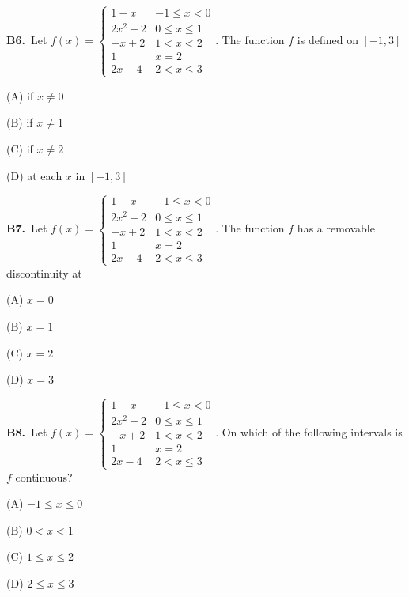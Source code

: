 \documentclass[11pt]{article}
\begin{document}
\bigskip\noindent\textbf{B6.}\ Let $f(x)=\begin{cases}1-x&-1\le x<0\\2x^2-2&0\le x\le1\\-x+2&1<x<2\\1&x=2\\2x-4&2<x\le3\end{cases}$. The function $f$ is defined on $[-1,3]$
\begin{list}{}{\setlength{\leftmargin}{3em}\setlength{\labelwidth}{2.5em}\setlength{\itemsep}{0pt}\setlength{\topsep}{2pt}}
\item[(A)] if $x \neq 0$
\item[(B)] if $x \neq 1$
\item[(C)] if $x \neq 2$
\item[(D)] at each $x$ in $[-1,3]$
\end{list}

\bigskip\noindent\textbf{B7.}\ Let $f(x)=\begin{cases}1-x&-1\le x<0\\2x^2-2&0\le x\le1\\-x+2&1<x<2\\1&x=2\\2x-4&2<x\le3\end{cases}$. The function $f$ has a removable discontinuity at
\begin{list}{}{\setlength{\leftmargin}{3em}\setlength{\labelwidth}{2.5em}\setlength{\itemsep}{0pt}\setlength{\topsep}{2pt}}
\item[(A)] $x = 0$
\item[(B)] $x = 1$
\item[(C)] $x = 2$
\item[(D)] $x = 3$
\end{list}

\bigskip\noindent\textbf{B8.}\ Let $f(x)=\begin{cases}1-x&-1\le x<0\\2x^2-2&0\le x\le1\\-x+2&1<x<2\\1&x=2\\2x-4&2<x\le3\end{cases}$. On which of the following intervals is $f$ continuous?
\begin{list}{}{\setlength{\leftmargin}{3em}\setlength{\labelwidth}{2.5em}\setlength{\itemsep}{0pt}\setlength{\topsep}{2pt}}
\item[(A)] $-1 \leq x \leq 0$
\item[(B)] $0 < x < 1$
\item[(C)] $1 \leq x \leq 2$
\item[(D)] $2 \leq x \leq 3$
\end{list}
\end{document}
